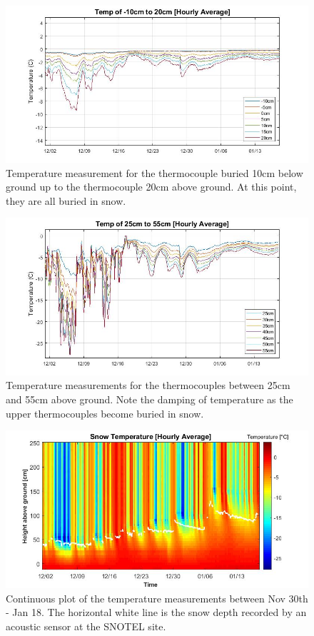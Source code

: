 \begin{figure}[H]
    \centering
    \includegraphics[width=0.9\linewidth]{figures/Soil_20cm_Accumulation.jpg}
    \caption{Temperature measurement for the thermocouple buried 10cm below ground up to the thermocouple 20cm above ground. At this point, they are all buried in snow.}
    \label{fig:Soil_20cm_Accumulation}
 \end{figure}

\begin{figure}[H]
    \centering
    \includegraphics[width=0.9\linewidth]{figures/25cm_55cm_Accumulation.jpg}
    \caption{Temperature measurements for the thermocouples between 25cm and 55cm above ground. Note the damping of temperature as the upper thermocouples become buried in snow.}
    \label{fig:25cm_55cm_Accumulation}
 \end{figure}
 
\begin{figure}[H]
    \centering
    \includegraphics[width=0.9\linewidth]{figures/Dec_Jan_ImageSC.jpg}
    \caption{Continuous plot of the temperature measurements between Nov 30th - Jan 18. The horizontal white line is the snow depth recorded by an acoustic sensor at the SNOTEL site. }
    \label{fig:Dec_Jan_ImageSC}
 \end{figure}

